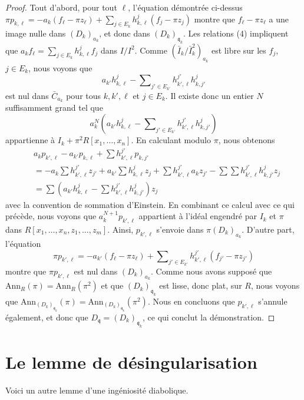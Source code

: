 \begin{proof}
\medskip\noindent
Tout d'abord, pour tout $\ell$, l'équation démontrée ci-dessus
$\pi p_{k, \ell} = -a_k(f_\ell - \pi z_\ell) +
\sum_{j \in E_k} h_{k, \ell}^j (f_j - \pi z_j)$ montre que
$f_\ell - \pi z_\ell$ a une image nulle dans $(D_k)_{a_k}$, et donc dans
$(D_k)_{\mathfrak q_k}$.
Les relations (4) impliquent que $a_k f_\ell =
\sum_{j \in E_k} h_{k, \ell}^j f_j$ dans $I/I^2$.
Comme $(\bar I_k/\bar I_k^2)_{a_k}$ est libre sur les $f_j$, $j \in E_k$,
nous voyons que
$$
a_{k'} h_{k, \ell}^j -
\sum\nolimits_{j' \in E_{k'}} h_{k', \ell}^{j'} h_{k, j'}^j
$$
est nul dans $\bar C_{a_k}$ pour tous $k, k', \ell$ et $j \in E_k$.
Il existe donc un entier $N$ suffisamment grand tel que
$$
a_k^N\left(
a_{k'} h_{k, \ell}^j -
\sum\nolimits_{j' \in E_{k'}} h_{k', \ell}^{j'} h_{k, j'}^j
\right)
$$
appartienne à $I_k + \pi^2R[x_1, \ldots, x_n]$. En calculant modulo $\pi$, nous obtenons
\begin{align*}
&
a_kp_{k', \ell} - a_{k'}p_{k, \ell} + \sum h_{k', \ell}^{j'} p_{k, j'}
\\
&
=
- a_k \sum h_{k', \ell}^{j'} z_{j'}
+ a_{k'} \sum h_{k, \ell}^j z_j
+ \sum h_{k', \ell}^{j'} a_k z_{j'}
- \sum \sum h_{k', \ell}^{j'} h_{k, j'}^j z_j \\
&
=
\sum \left(
a_{k'} h_{k, \ell}^j
- \sum h_{k', \ell}^{j'} h_{k, j'}^j
\right) z_j
\end{align*}
avec la convention de sommation d'Einstein. En combinant ce calcul avec ce qui précède,
nous voyons que $a_k^{N + 1} p_{k', \ell}$ appartient à l'idéal engendré
par $I_k$ et $\pi$ dans $R[x_1, \ldots, x_n, z_1, \ldots, z_m]$.
Ainsi, $p_{k', \ell}$ s'envoie dans $\pi (D_k)_{a_k}$. D'autre part, l'équation
$$
\pi p_{k', \ell} =
-a_{k'} (f_\ell - \pi z_\ell) +
\sum\nolimits_{j' \in E_{k'}} h_{k', \ell}^{j'}(f_{j'} - \pi z_{j'})
$$
montre que $\pi p_{k', \ell}$ est nul dans $(D_k)_{a_k}$.
Comme nous avons supposé que $\text{Ann}_R(\pi) = \text{Ann}_R(\pi^2)$
et que $(D_k)_{\mathfrak q_k}$ est lisse, donc plat, sur $R$,
nous voyons que
$\text{Ann}_{(D_k)_{\mathfrak q_k}}(\pi) =
\text{Ann}_{(D_k)_{\mathfrak q_k}}(\pi^2)$.
Nous en concluons que $p_{k', \ell}$ s'annule également, et donc que
$D_{\mathfrak q} = (D_k)_{\mathfrak q_k}$, ce qui conclut la démonstration.
\end{proof}
\section{Le lemme de désingularisation}
\label{section-desingularization-lemma}

\noindent
Voici un autre lemme d'une ingéniosité diabolique.

